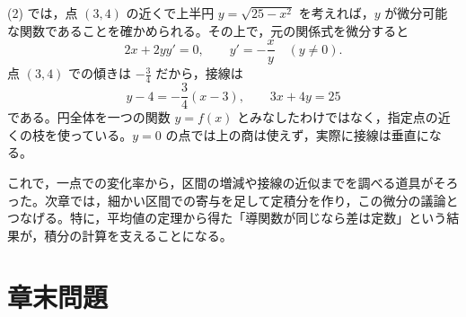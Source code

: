 (2) では，点 $(3,4)$ の近くで上半円 $y=\sqrt{25-x^2}$ を考えれば，$y$ が微分可能な関数であることを確かめられる。その上で，元の関係式を微分すると
\[
 2x+2yy'=0,\qquad y'=-\frac xy\quad(y\ne0).
\]
点 $(3,4)$ での傾きは $-\frac34$ だから，接線は
\[
 y-4=-\frac34(x-3),\qquad 3x+4y=25
\]
である。円全体を一つの関数 $y=f(x)$ とみなしたわけではなく，指定点の近くの枝を使っている。$y=0$ の点では上の商は使えず，実際に接線は垂直になる。

これで，一点での変化率から，区間の増減や接線の近似までを調べる道具がそろった。次章では，細かい区間での寄与を足して定積分を作り，この微分の議論とつなげる。特に，平均値の定理から得た「導関数が同じなら差は定数」という結果が，積分の計算を支えることになる。

\section*{章末問題}

